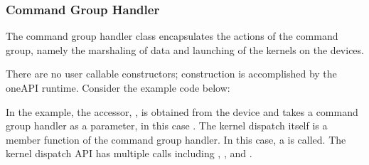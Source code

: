 \documentclass[letterpaper,10pt,english]{sphinxmanual}
\begin{document}
\subsubsection{Command Group Handler}
\label{\detokenize{programming-interface/parallelism/command-group-handler:command-group-handler}}\label{\detokenize{programming-interface/parallelism/command-group-handler:id1}}\label{\detokenize{programming-interface/parallelism/command-group-handler::doc}}
The command group handler class encapsulates the actions of the command
group, namely the marshaling of data and launching of the kernels on the
devices.

There are no user callable constructors; construction is accomplished by
the oneAPI runtime. Consider the example code below:

\begin{sphinxVerbatim}[commandchars=\\\{\}]
\PYG{p}{[}\PYG{p}{]}  
            
          \PYG{p}{[}\PYG{p}{]}  
           \PYG{p}{[}\PYG{p}{]} 
\end{sphinxVerbatim}

In the example, the accessor, , is obtained from the device and
takes a command group handler as a parameter, in this case . The
kernel dispatch itself is a member function of the command group
handler. In this case, a  is called. The kernel dispatch
API has multiple calls including ,
, and .
\end{document}
